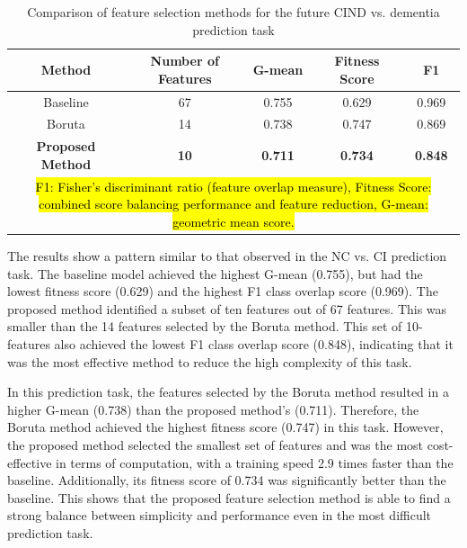 \begin{table}[!ht]
    \centering
    \caption{Comparison of feature selection methods for the future CIND vs. dementia prediction task}
    \begin{tabular}{|c|c|c|c|c|}
    \hline
        Method & Number of Features & G-mean & Fitness Score & F1 \\ \hline
        Baseline & 67 & 0.755 & 0.629 & 0.969 \\ \hline
        Boruta & 14 & 0.738 & 0.747 & 0.869 \\ \hline
        \textbf{Proposed Method} & \textbf{10} & \textbf{0.711} & \textbf{0.734} & \textbf{0.848} \\ \hline
        \multicolumn{5}{p{400pt}}{\footnotesize \hl{F1: Fisher's discriminant ratio (feature overlap measure), Fitness Score: combined score balancing performance and feature reduction, G-mean: geometric mean score.}}
    \end{tabular}
    \label{table:fs-task4}
\end{table}

The results show a pattern similar to that observed in the NC vs. CI prediction task. The baseline model achieved the highest G-mean (0.755), but had the lowest fitness score (0.629) and the highest F1 class overlap score (0.969). The proposed method identified a subset of ten features out of 67 features. This was smaller than the 14 features selected by the Boruta method. This set of 10-features also achieved the lowest F1 class overlap score (0.848), indicating that it was the most effective method to reduce the high complexity of this task.

In this prediction task, the features selected by the Boruta method resulted in a higher G-mean (0.738) than the proposed method's (0.711). Therefore, the Boruta method achieved the highest fitness score (0.747) in this task. However, the proposed method selected the smallest set of features and was the most cost-effective in terms of computation, with a training speed 2.9 times faster than the baseline. Additionally, its fitness score of 0.734 was significantly better than the baseline. This shows that the proposed feature selection method is able to find a strong balance between simplicity and performance even in the most difficult prediction task.

